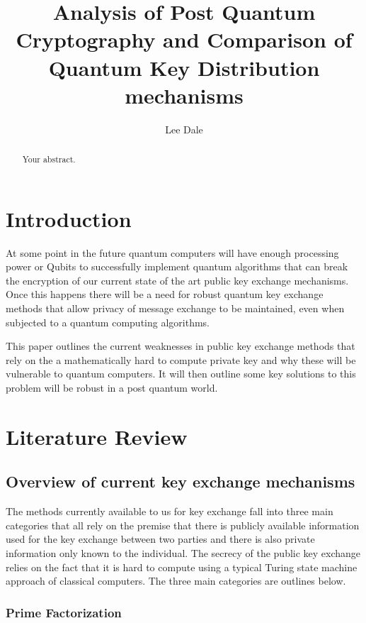 \documentclass{article}
\title{Analysis of Post Quantum Cryptography and Comparison of Quantum Key Distribution mechanisms}
\author{Lee Dale}
\begin{document}
\maketitle

\begin{abstract}
Your abstract.
\end{abstract}

\section{Introduction}

At some point in the future quantum computers will have enough processing power or Qubits to successfully implement quantum algorithms that can break the encryption of our current state of the art public key exchange mechanisms. Once this happens there will be a need for robust quantum key exchange methods that allow privacy of message exchange to be maintained, even when subjected to a quantum computing algorithms. 

This paper outlines the current weaknesses in public key exchange methods that rely on the a mathematically hard to compute private key and why these will be vulnerable to quantum computers. It will then outline some key solutions to this problem will be robust in a post quantum world. 

\section{Literature Review}

\subsection{Overview of current key exchange mechanisms}

The methods currently available to us for key exchange fall into three main categories that all rely on the premise that there is publicly available information used for the key exchange between two parties and there is also private information only known to the individual. The secrecy of the public key exchange relies on the fact  that it is hard to compute using a typical Turing state machine approach of classical computers. The three main categories are outlines below.

\subsubsection{Prime Factorization}
\end{document}
